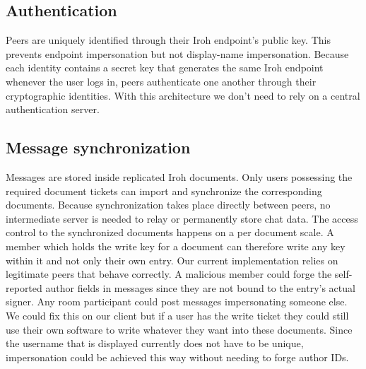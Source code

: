 \documentclass{article} %
\begin{document}
\subsection{Authentication}
Peers are uniquely identified through their Iroh endpoint's public key.
This prevents endpoint impersonation but not display-name impersonation.
Because each identity contains a secret key that generates the same
Iroh endpoint whenever the user logs in, peers authenticate one
another through their cryptographic identities. With this architecture we don't need to rely on a central authentication server.\\

\subsection{Message synchronization}

Messages are stored inside replicated Iroh documents. Only users possessing the
required document tickets can import and synchronize the corresponding
documents. Because synchronization takes place directly between peers, no
intermediate server is needed to relay or permanently store chat data.
The access control to the synchronized documents happens on a per document scale. A member which holds the write key for a document can therefore write any key within it and not only their own entry. Our current implementation relies on legitimate peers that behave correctly. A malicious member could forge the self-reported author fields in messages since they are not bound to the entry's actual signer.
Any room participant could post messages impersonating someone else. We could fix this on our client but if a user has the write ticket they could still use their own software to write whatever they want into these documents. Since the username that is displayed currently does not have to be unique, impersonation could be achieved this way without needing to forge author IDs.
\end{document}

